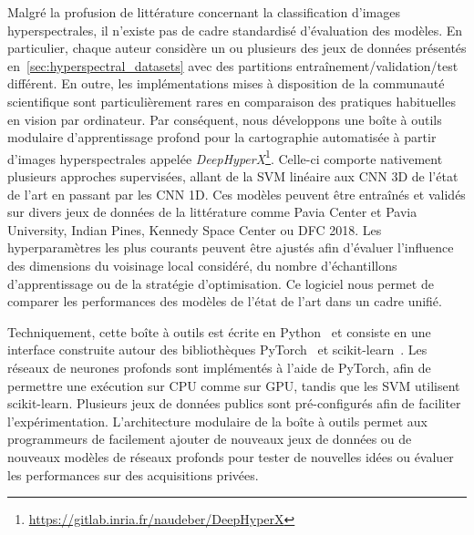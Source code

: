 Malgré la profusion de littérature concernant la classification d'images hyperspectrales, il n'existe pas de cadre standardisé d'évaluation des modèles. En particulier, chaque auteur considère un ou plusieurs des jeux de données présentés en~\cref{sec:hyperspectral_datasets} avec des partitions entraînement/validation/test différent. En outre, les implémentations mises à disposition de la communauté scientifique sont particulièrement rares en comparaison des pratiques habituelles en vision par ordinateur. Par conséquent, nous développons une boîte à outils modulaire d'apprentissage profond pour la cartographie automatisée à partir d'images hyperspectrales appelée \emph{DeepHyperX}\footnote{\url{https://gitlab.inria.fr/naudeber/DeepHyperX}}. Celle-ci comporte nativement plusieurs approches supervisées, allant de la \gls{SVM} linéaire aux \gls{CNN} 3D de l'état de l'art en passant par les \gls{CNN} 1D. Ces modèles peuvent être entraînés et validés sur divers jeux de données de la littérature comme Pavia Center et Pavia University, Indian Pines, Kennedy Space Center ou \gls{DFC} 2018. Les hyperparamètres les plus courants peuvent être ajustés afin d'évaluer l'influence des dimensions du voisinage local considéré, du nombre d'échantillons d'apprentissage ou de la stratégie d'optimisation. Ce logiciel nous permet de comparer les performances des modèles de l'état de l'art dans un cadre unifié.


Techniquement, cette boîte à outils est écrite en Python~\cite{python_software_foundation_python_nodate} et consiste en une interface construite autour des bibliothèques \gls{PyTorch}~\cite{noauthor_pytorch_2016} et \gls{scikit-learn}~\cite{pedregosa_scikit-learn_2011}. Les réseaux de neurones profonds sont implémentés à l'aide de \gls{PyTorch}, afin de permettre une exécution sur \gls{CPU} comme sur \gls{GPU}, tandis que les \gls{SVM} utilisent \gls{scikit-learn}. Plusieurs jeux de données publics sont pré-configurés afin de faciliter l'expérimentation. L'architecture modulaire de la boîte à outils permet aux programmeurs de facilement ajouter de nouveaux jeux de données ou de nouveaux modèles de réseaux profonds pour tester de nouvelles idées ou évaluer les performances sur des acquisitions privées.

